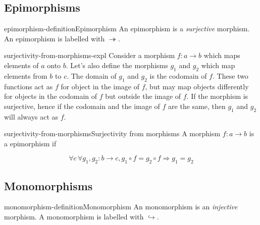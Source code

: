 \documentclass[preview]{standalone}
\begin{document}
\subsection{Epimorphisms}

\begin{snippetdefinition}{epimorphism-definition}{Epimorphism}
    An epimorphism is a \textit{surjective} morphism.
    An epimorphism is labelled with \(\twoheadrightarrow\).
\end{snippetdefinition}

\begin{snippet}{surjectivity-from-morphisms-expl}
    Consider a morphism \(f\colon a \rightarrow b\) which maps elements of \(a\) onto \(b\).
    Let's also define the morphisms \(g_1\) and \(g_2\) which map elements from \(b\) to \(c\).
    The domain of \(g_1\) and \(g_2\) is the codomain of \(f\). These two functions act
    as \(f\) for object in the image of \(f\), but may map objects differently
    for objects in the codomain of \(f\) but outside the image of \(f\).
    If the morphism is surjective, hence if the codomain and the image of \(f\) are the same,
    then \(g_1\) and \(g_2\) will always act as \(f\).
\end{snippet}

\begin{snippetdefinition}{surjectivity-from-morphisms}{Surjectivity from morphisms}
    A morphism \(f\colon a \rightarrow b\) is a epimorphism if

    \[
        \forall c\, \forall g_1, g_2 : b \rightarrow c, g_1 \circ f = g_2 \circ f \Rightarrow g_1 = g_2
    \]

    \begin{center}
    \end{center}
\end{snippetdefinition}

\subsection{Monomorphisms}

\begin{snippetdefinition}{monomorphism-definition}{Monomorphism}
    An monomorphism is an \textit{injective} morphism.
    A monomorphism is labelled with \(\hookrightarrow\).
\end{snippetdefinition}
\end{document}
